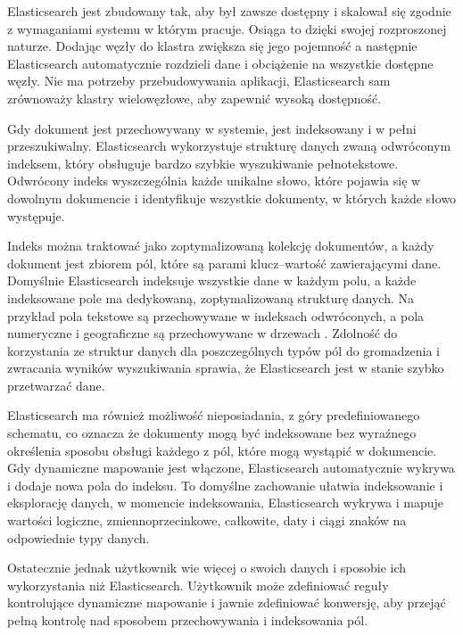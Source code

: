 Elasticsearch jest zbudowany tak, aby był zawsze dostępny i skalował się zgodnie z wymaganiami systemu w którym pracuje. Osiąga to dzięki swojej rozproszonej naturze. Dodając węzły do klastra zwiększa się jego pojemność a następnie Elasticsearch automatycznie rozdzieli dane i obciążenie na wszystkie dostępne węzły. Nie ma potrzeby przebudowywania aplikacji, Elasticsearch sam zrównoważy klastry wielowęzłowe, aby zapewnić wysoką dostępność.

Gdy dokument jest przechowywany w systemie, jest indeksowany i w pełni przeszukiwalny. Elasticsearch wykorzystuje strukturę danych zwaną odwróconym indeksem, który obsługuje bardzo szybkie wyszukiwanie pełnotekstowe. Odwrócony indeks wyszczególnia każde unikalne słowo, które pojawia się w dowolnym dokumencie i identyfikuje wszystkie dokumenty, w których każde słowo występuje\cite{elasticSearchManualDataIn}.  

Indeks można traktować jako zoptymalizowaną kolekcję dokumentów, a każdy dokument jest zbiorem pól, które są parami klucz--wartość zawierającymi dane. Domyślnie Elasticsearch indeksuje wszystkie dane w każdym polu, a każde indeksowane pole ma dedykowaną, zoptymalizowaną strukturę danych.
Na przykład pola tekstowe są przechowywane w indeksach odwróconych, a pola numeryczne i geograficzne są przechowywane w drzewach . Zdolność do korzystania ze struktur danych dla poszczególnych typów pól do gromadzenia i zwracania wyników wyszukiwania sprawia, że Elasticsearch jest w stanie szybko przetwarzać dane\cite{elasticSearchManualDataIn}.

Elasticsearch ma również możliwość nieposiadania, z góry predefiniowanego schematu, co oznacza że dokumenty mogą być indeksowane bez wyraźnego określenia sposobu obsługi każdego z pól, które mogą wystąpić w dokumencie. Gdy dynamiczne mapowanie jest włączone, Elasticsearch automatycznie wykrywa i dodaje nowa pola do indeksu. To domyślne zachowanie ułatwia indeksowanie i eksplorację danych, w momencie indeksowania, Elasticsearch wykrywa i mapuje wartości logiczne, zmiennoprzecinkowe, całkowite, daty i ciągi znaków na odpowiednie typy danych\cite{elasticSearchManualDataIn}. 

Ostatecznie jednak użytkownik wie więcej o swoich danych i sposobie ich wykorzystania niż Elasticsearch. Użytkownik może zdefiniować reguły kontrolujące dynamiczne mapowanie i jawnie zdefiniować konwersję, aby przejąć pełną kontrolę nad sposobem przechowywania i indeksowania pól\cite{elasticSearchManualDataIn}.

